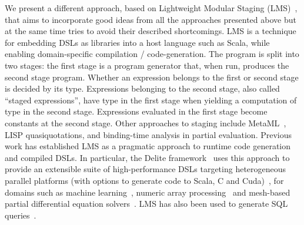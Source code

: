 \documentclass[runningheads,a4paper]{llncs}
\begin{document}
We present a different approach, based on Lightweight Modular Staging
(LMS)~\cite{lms}, that aims to incorporate good ideas from all the
approaches presented above but at the same time tries to avoid their
described shortcomings. LMS is a technique for embedding DSLs as
libraries into a host language such as Scala, while enabling
domain-specific compilation / code-generation. The program is split
into two stages: the first stage is a program generator that, when
run, produces the second stage program. Whether an expression belongs
to the first or second stage is decided by its type. Expressions
belonging to the second stage, also called ``staged expressions'',
have type  in the first stage when yielding a computation
of type  in the second stage. Expressions evaluated in the
first stage become constants at the second stage. Other approaches to
staging include MetaML~\cite{metaml}, LISP quasiquotations, and
binding-time analysis in partial evaluation. Previous work has
established LMS as a pragmatic approach to runtime code generation and
compiled DSLs. In particular, the Delite
framework~\cite{brown11dsl,rompf11dsl,ppopp11delite} uses this
approach to provide an extensible suite of high-performance DSLs
targeting heterogeneous parallel platforms (with options to generate
code to Scala, C and Cuda)~\cite{lee11dsl}, for domains such as
machine learning~\cite{icml11optiml}, numeric array
processing~\cite{ureche12} and mesh-based partial differential
equation solvers~\cite{hassan10virtualization}. LMS has also been used
to generate SQL queries~\cite{siq}.



\end{document}
